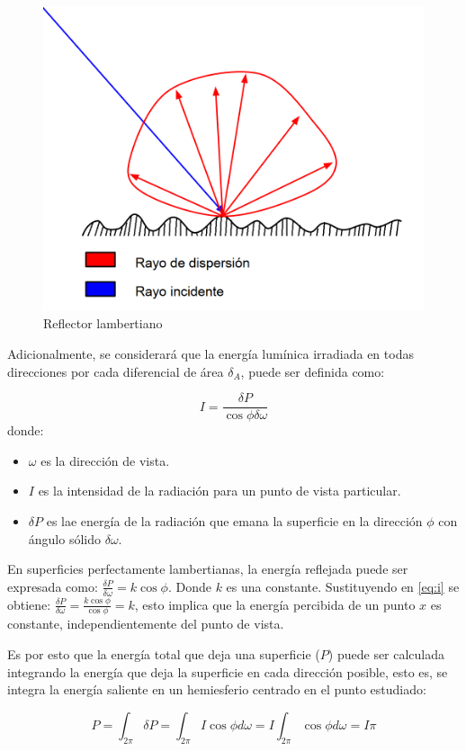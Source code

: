 \vspace{5mm}
\begin{figure}[h]
	\centering
	\includegraphics[width=.6\linewidth]{assets/difusac}
	\caption{Reflector lambertiano}
	\label{img:lamber}
\end{figure}

Adicionalmente, se considerará que la energía lumínica irradiada en todas direcciones por cada diferencial de área $\delta_{A}$, puede ser definida como:

\begin{equation}
    I = \frac{\delta{P}}{\cos{\phi\delta\omega}} \label{eq:i}
\end{equation}
donde:
\begin{itemize}
	\item $\omega$ es la dirección de vista.
    \item $I$ es la intensidad de la radiación para un punto de vista particular.
    \item $\delta{P}$ es lae energía de la radiación que emana la superficie en la dirección $\phi$ con ángulo sólido $\delta\omega$.
\end{itemize}

En superficies perfectamente lambertianas, la energía reflejada puede ser expresada como: $\frac{\delta{P}}{\delta{\omega}} = k\cos{\phi}$. Donde $k$ es una constante.
Sustituyendo en \eqref{eq:i} se obtiene: $\frac{\delta{P}}{\delta{\omega}} = \frac{k\cos{\phi}}{\cos{\phi}} = k$, esto implica que la energía percibida de un punto $x$ 
es constante, independientemente del punto de vista.

Es por esto que la energía total que deja una superficie ($P$) puede ser calculada integrando la energía que deja la superficie en cada dirección posible, esto es, se integra la energía saliente en un hemiesferio centrado en el punto estudiado:

\begin{equation}
    P = \int_{2\pi} \delta{P} = \int_{2\pi} I\cos{\phi}d{\omega} = I \int_{2\pi} \cos{\phi}d{\omega} = I\pi
    \label{eq:P}
\end{equation}

